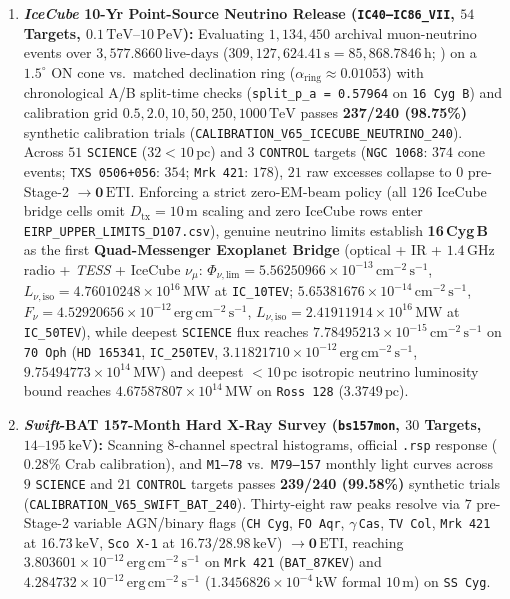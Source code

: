 \documentclass[twocolumn,10pt]{article}
\begin{document}
\begin{enumerate}
  \item \textbf{\textit{IceCube} 10-Yr Point-Source Neutrino Release (\texttt{IC40--IC86\_VII}, $54$ Targets, $0.1\,\mathrm{TeV}\text{--}10\,\mathrm{PeV}$):} Evaluating $1{,}134{,}450$ archival muon-neutrino events over $3{,}577.8660\,\text{live-days}$ ($309{,}127{,}624.41\,\text{s} = 85{,}868.7846\,\text{h}$; \cite{IceCube10YrData,Aartsen2020,Abbasi2022}) on a $1.5^\circ$ ON cone vs.\ matched declination ring ($\alpha_{\mathrm{ring}} \approx 0.01053$) with chronological A/B split-time checks (\texttt{split\_p\_a = 0.57964} on \texttt{16\,Cyg\,B}) and calibration grid $0.5, 2.0, 10, 50, 250, 1000\,\mathrm{TeV}$ passes \textbf{237/240 (98.75\%)} synthetic calibration trials (\texttt{CALIBRATION\_V65\_ICECUBE\_NEUTRINO\_240}). Across $51$ \texttt{SCIENCE} ($32 < 10\,\text{pc}$) and $3$ \texttt{CONTROL} targets (\texttt{NGC\,1068}: $374$ cone events; \texttt{TXS\,0506+056}: $354$; \texttt{Mrk\,421}: $178$), $21$ raw excesses collapse to $0$ pre-Stage-2 $\rightarrow \mathbf{0\,\mathrm{ETI}}$. Enforcing a strict zero-EM-beam policy (all $126$ IceCube bridge cells omit $D_{\mathrm{tx}}=10\,\text{m}$ scaling and zero IceCube rows enter \texttt{EIRP\_UPPER\_LIMITS\_D107.csv}), genuine neutrino limits establish \textbf{16\,Cyg\,B} as the first \textbf{Quad-Messenger Exoplanet Bridge} (optical + IR + $1.4\,\text{GHz}$ radio + \textit{TESS} + IceCube $\nu_\mu$: $\Phi_{\nu,\mathrm{lim}} = 5.56250966\times 10^{-13}\,\mathrm{cm^{-2}\,s^{-1}}$, $L_{\nu,\mathrm{iso}} = 4.76010248\times 10^{16}\,\mathrm{MW}$ at \texttt{IC\_10TEV}; $5.65381676\times 10^{-14}\,\mathrm{cm^{-2}\,s^{-1}}$, $F_\nu = 4.52920656\times 10^{-12}\,\mathrm{erg\,cm^{-2}\,s^{-1}}$, $L_{\nu,\mathrm{iso}} = 2.41911914\times 10^{16}\,\mathrm{MW}$ at \texttt{IC\_50TEV}), while deepest \texttt{SCIENCE} flux reaches $7.78495213\times 10^{-15}\,\mathrm{cm^{-2}\,s^{-1}}$ on \texttt{70\,Oph} (\texttt{HD\,165341}, \texttt{IC\_250TEV}, $3.11821710\times 10^{-12}\,\mathrm{erg\,cm^{-2}\,s^{-1}}$, $9.75494773\times 10^{14}\,\mathrm{MW}$) and deepest $<10\,\text{pc}$ isotropic neutrino luminosity bound reaches \textbf{$4.67587807\times 10^{14}\,\mathrm{MW}$} on \texttt{Ross\,128} ($3.3749\,\text{pc}$).
  \item \textbf{\textit{Swift}-BAT 157-Month Hard X-Ray Survey (\texttt{bs157mon}, $30$ Targets, $14\text{--}195\,\mathrm{keV}$):} Scanning $8$-channel spectral histograms, official \texttt{.rsp} response ($0.28\%$ Crab calibration), and \texttt{M1--78} vs.\ \texttt{M79--157} monthly light curves \cite{Barthelmy2005,Lien2025} across $9$ \texttt{SCIENCE} and $21$ \texttt{CONTROL} targets passes \textbf{239/240 (99.58\%)} synthetic trials (\texttt{CALIBRATION\_V65\_SWIFT\_BAT\_240}). Thirty-eight raw peaks resolve via $7$ pre-Stage-2 variable AGN/binary flags (\texttt{CH\,Cyg}, \texttt{FO\,Aqr}, $\gamma$\,\texttt{Cas}, \texttt{TV\,Col}, \texttt{Mrk\,421} at $16.73\,\mathrm{keV}$, \texttt{Sco\,X-1} at $16.73/28.98\,\mathrm{keV}$) $\rightarrow \mathbf{0\,\mathrm{ETI}}$, reaching $3.803601\times 10^{-12}\,\mathrm{erg\,cm^{-2}\,s^{-1}}$ on \texttt{Mrk\,421} (\texttt{BAT\_87KEV}) and $4.284732\times 10^{-12}\,\mathrm{erg\,cm^{-2}\,s^{-1}}$ ($1.3456826\times 10^{-4}\,\mathrm{kW}$ formal $10\,\text{m}$) on \texttt{SS\,Cyg}.

\end{enumerate}
\end{document}
